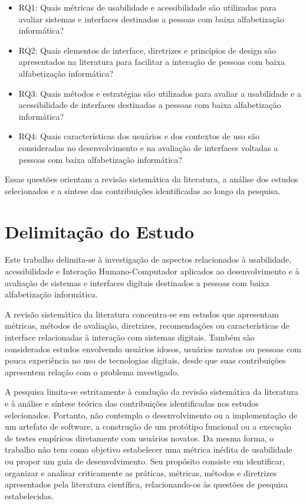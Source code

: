 \begin{itemize}

    \item RQ1: Quais métricas de usabilidade e acessibilidade são utilizadas para avaliar sistemas e interfaces destinados a pessoas com baixa alfabetização informática?

    \item RQ2: Quais elementos de interface, diretrizes e princípios de design são apresentados na literatura para facilitar a interação de pessoas com baixa alfabetização informática?

    \item RQ3: Quais métodos e estratégias são utilizados para avaliar a usabilidade e a acessibilidade de interfaces destinadas a pessoas com baixa alfabetização informática?

    \item RQ4: Quais características dos usuários e dos contextos de uso são consideradas no desenvolvimento e na avaliação de interfaces voltadas a pessoas com baixa alfabetização informática?

\end{itemize}

Essas questões orientam a revisão sistemática da literatura, a análise dos estudos selecionados e a síntese das contribuições identificadas ao longo da pesquisa.

\section{Delimitação do Estudo}

Este trabalho delimita-se à investigação de aspectos relacionados à usabilidade, acessibilidade e Interação Humano-Computador aplicados ao desenvolvimento e à avaliação de sistemas e interfaces digitais destinados a pessoas com baixa alfabetização informática.

A revisão sistemática da literatura concentra-se em estudos que apresentam métricas, métodos de avaliação, diretrizes, recomendações ou características de interface relacionadas à interação com sistemas digitais. Também são considerados estudos envolvendo usuários idosos, usuários novatos ou pessoas com pouca experiência no uso de tecnologias digitais, desde que suas contribuições apresentem relação com o problema investigado.

A pesquisa limita-se estritamente à condução da revisão sistemática da literatura e à análise e síntese teórica das contribuições identificadas nos estudos selecionados. Portanto, não contempla o desenvolvimento ou a implementação de um artefato de software, a construção de um protótipo funcional ou a execução de testes empíricos diretamente com usuários novatos. Da mesma forma, o trabalho não tem como objetivo estabelecer uma métrica inédita de usabilidade ou propor um guia de desenvolvimento. Seu propósito consiste em identificar, organizar e analisar criticamente as práticas, métricas, métodos e diretrizes apresentados pela literatura científica, relacionando-os às questões de pesquisa estabelecidas.


